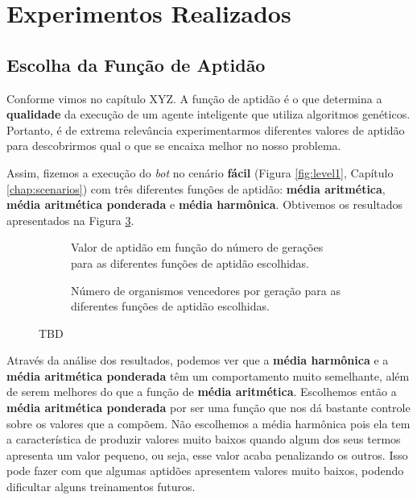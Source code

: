 \section{\label{section:experiments}Experimentos Realizados}

\subsection{Escolha da Função de Aptidão}


Conforme vimos no capítulo XYZ. A função de aptidão é o que determina a
\textbf{qualidade} da execução de um agente inteligente que utiliza algoritmos
genéticos. Portanto, é de extrema relevância experimentarmos diferentes valores
de aptidão para descobrirmos qual o que se encaixa melhor no nosso problema.

Assim, fizemos a execução do \textit{bot} no cenário \textbf{fácil} (Figura
\ref{fig:level1}, Capítulo \ref{chap:scenarios}) com três diferentes funções de
aptidão: \textbf{média aritmética}, \textbf{média aritmética ponderada} e
\textbf{média harmônica}. Obtivemos os resultados apresentados na Figura
\ref{fig:fitness-experiment}.

\begin{figure}[H]
\centering
	\begin{subfigure}[b]{0.4\textwidth}
        \caption{Valor de aptidão em função do número de gerações para as
        diferentes funções de aptidão escolhidas.}
		\label{fig:tbd1}
	\end{subfigure}
	\begin{subfigure}[b]{0.4\textwidth}
        \caption{Número de organismos vencedores por geração para as diferentes
        funções de aptidão escolhidas.}
		\label{fig:tbd1}
	\end{subfigure}

    \caption{TBD}
	\label{fig:fitness-experiment}
\end{figure}

Através da análise dos resultados, podemos ver que a \textbf{média harmônica} e
a \textbf{média aritmética ponderada} têm um comportamento muito semelhante,
além de serem melhores do que a função de \textbf{média aritmética}. Escolhemos
então a \textbf{média aritmética ponderada} por ser uma função que nos dá
bastante controle sobre os valores que a compõem. Não escolhemos a média
harmônica pois ela tem a característica de produzir valores muito baixos quando
algum dos seus termos apresenta um valor pequeno, ou seja, esse valor acaba
penalizando os outros. Isso pode fazer com que algumas aptidões apresentem
valores muito baixos, podendo dificultar alguns treinamentos futuros.

